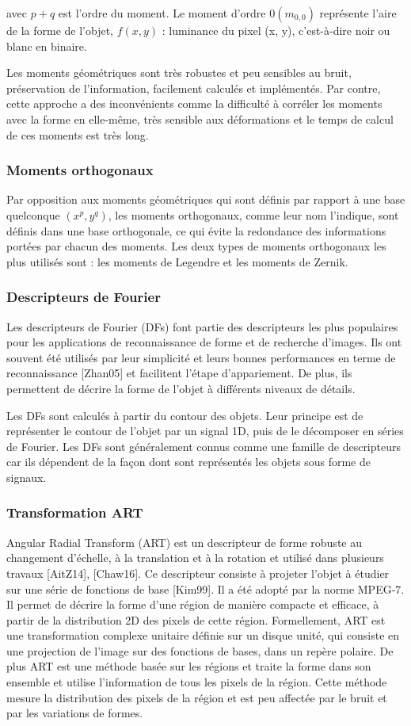 avec $p+q$ est l'ordre du moment. Le moment d’ordre $0 (m_{0,0})$  représente l’aire de la forme de l'objet, $f(x, y)$ : luminance du pixel (x, y), c’est-à-dire noir ou blanc en binaire.

Les moments géométriques sont très robustes et peu sensibles au bruit, préservation de l’information, facilement calculés et implémentés. Par contre, cette approche a des inconvénients comme la difficulté à corréler les moments avec la forme en elle-même, très sensible aux déformations et le temps de calcul de ces moments est très long.

\subsubsection{Moments orthogonaux}
Par opposition aux moments géométriques qui sont définis par rapport à une base quelconque $(x^p, y^q)$, les moments orthogonaux, comme leur nom l’indique, sont définis dans une base orthogonale, ce qui évite la redondance des informations portées par chacun des moments. Les deux types de moments orthogonaux les plus utilisés sont : les moments de Legendre et les moments de Zernik.

\subsubsection{Descripteurs de Fourier}
Les descripteurs de Fourier (DFs) font partie des descripteurs les plus populaires pour les applications de reconnaissance de forme et de recherche d’images. Ils ont souvent été utilisés par leur simplicité et leurs bonnes performances en terme de reconnaissance [Zhan05] et facilitent l'étape d'appariement. De plus, ils permettent de décrire la forme de l’objet à différents niveaux de détails.

Les DFs sont calculés à partir du contour des objets. Leur principe est de représenter le contour de l'objet par un signal 1D, puis de le décomposer en séries de Fourier. Les DFs sont généralement connus comme une famille de descripteurs car ils dépendent de la façon dont sont représentés les objets sous forme de signaux.

\subsubsection{Transformation ART}
Angular Radial Transform (ART) est un descripteur de forme robuste au changement d’échelle, à la translation et à la rotation et utilisé dans plusieurs travaux [AitZ14], [Chaw16]. Ce descripteur consiste à projeter l’objet à étudier sur une série de fonctions de base [Kim99]. Il a été
adopté par la norme MPEG-7. Il permet de décrire la forme d’une région de manière compacte et efficace, à partir de la distribution 2D des pixels de cette région. Formellement, ART est une transformation complexe unitaire définie sur un disque unité, qui consiste en une projection de
l’image sur des fonctions de bases, dans un repère polaire. De plus ART est une méthode basée sur les régions et traite la forme dans son ensemble et utilise l’information de tous les pixels de la région. Cette méthode mesure la distribution des pixels de la région et est peu affectée par le bruit et par les variations de formes.

